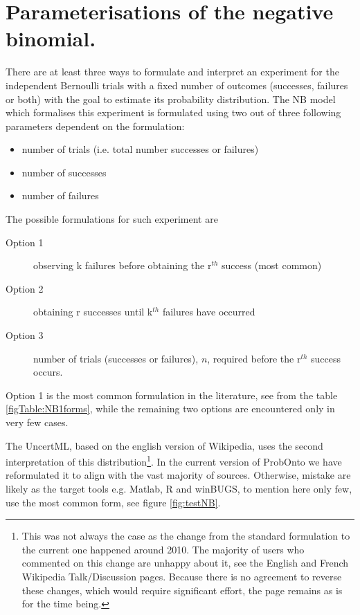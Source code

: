 \newpage
\section{Parameterisations of the negative binomial.}
\label{app:sec:NB1discussion}

There are at least three ways to formulate and interpret an experiment for 
the independent Bernoulli trials with a fixed number of outcomes (successes,
failures or both) with the goal to estimate its probability distribution. 
The NB model which formalises this experiment is formulated using two 
out of three following parameters dependent on the formulation: 
\begin{itemize}
\item 
number of trials (i.e. total number successes or failures) %
\item
number of successes %
\item
number of failures %
\end{itemize} 
The possible formulations for such experiment are 
\begin{description}
\item[Option 1]
observing k failures before obtaining the r$^{th}$ success (most common)
\item[Option 2]
obtaining r successes until k$^{th}$ failures have occurred
\item[Option 3]
number of trials (successes or failures), $n$, required before the r$^{th}$ success occurs.
\end{description}
Option 1 is the most common formulation in the literature, see from the table \ref{figTable:NB1forms}, 
while the remaining two options are encountered only in very few cases.

The UncertML, based on the english version of Wikipedia, uses the second 
interpretation of this distribution\footnote{This was not always the case as the change 
from the standard formulation to the current one happened around 2010. The majority 
of users who commented on this change are unhappy about it, see the English and French 
Wikipedia Talk/Discussion pages. 
Because there is no agreement to reverse these changes, which would require 
significant effort, the page remains as is for the time being.}. In the current version 
of ProbOnto we have reformulated it to align with the vast majority of sources. 
Otherwise, mistake are likely as the target tools e.g. Matlab, R and 
winBUGS, to mention here only few, use the most common form, see figure 
\ref{fig:testNB}.


